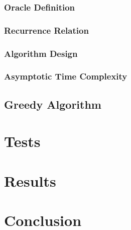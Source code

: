 \documentclass[conference]{IEEEtran}
\begin{document}
\subsubsection{Oracle Definition}

\subsubsection{Recurrence Relation}

\subsubsection{Algorithm Design}

\subsubsection{Asymptotic Time Complexity}

\subsection{Greedy Algorithm}

\section{Tests}

\section{Results}


\section{Conclusion}



\end{document}
